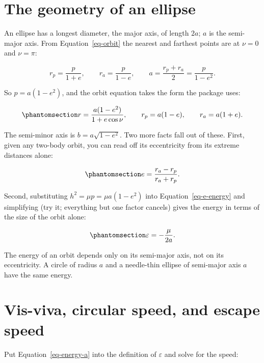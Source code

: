 \documentclass[
  10.5pt,
  letterpaper,
]{scrbook}
\theoremstyle{plain}
\theoremstyle{remark}
\begin{document}
\section{The geometry of an ellipse}\label{the-geometry-of-an-ellipse}

An ellipse has a longest diameter, the major axis, of length \(2a\);
\(a\) is the semi-major axis. From Equation~\ref{eq-orbit} the nearest
and farthest points are at \(\nu = 0\) and \(\nu = \pi\):

\[
r_p = \frac{p}{1+e}, \qquad r_a = \frac{p}{1-e}, \qquad a = \frac{r_p + r_a}{2} = \frac{p}{1-e^2}.
\]

So \(p = a(1-e^2)\), and the orbit equation takes the form the package
uses:

\begin{equation}\protect\phantomsection\label{eq-orbit-a}{
r = \frac{a(1-e^2)}{1+e\cos\nu}, \qquad r_p = a(1-e), \qquad r_a = a(1+e).
}\end{equation}

The semi-minor axis is \(b = a\sqrt{1-e^2}\). Two more facts fall out of
these. First, given any two-body orbit, you can read off its
eccentricity from its extreme distances alone:

\begin{equation}\protect\phantomsection\label{eq-e-from-extremes}{
e = \frac{r_a - r_p}{r_a + r_p}.
}\end{equation}

Second, substituting \(h^2 = \mu p = \mu a(1-e^2)\) into
Equation~\ref{eq-e-energy} and simplifying (try it; everything but one
factor cancels) gives the energy in terms of the size of the orbit
alone:

\begin{equation}\protect\phantomsection\label{eq-energy-a}{
\varepsilon = -\frac{\mu}{2a}.
}\end{equation}

The energy of an orbit depends only on its semi-major axis, not on its
eccentricity. A circle of radius \(a\) and a needle-thin ellipse of
semi-major axis \(a\) have the same energy.

\section{Vis-viva, circular speed, and escape
speed}\label{vis-viva-circular-speed-and-escape-speed}

Put Equation~\ref{eq-energy-a} into the definition of \(\varepsilon\)
and solve for the speed:
\end{document}
